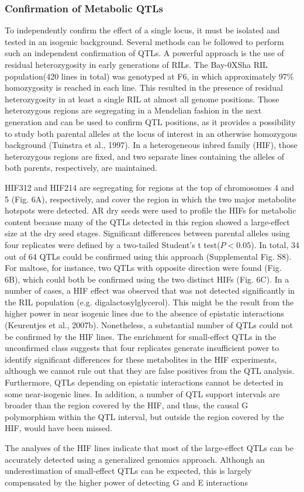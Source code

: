 \subsubsection{Confirmation of Metabolic QTLs}
To independently confirm the effect of a single locus, it must be isolated and tested in an isogenic 
background. Several methods can be followed to perform such an independent confirmation of QTLs. A 
powerful approach is the use of residual heterozygosity in early generations of RILs. The Bay-0XSha 
RIL population(420 lines in total) was genotyped at F6, in which approximately 97\% homozygosity is 
reached in each line. This resulted in the presence of residual heterozygosity in at least a single 
RIL at almost all genome positions. Those heterozygous regions are segregating in a Mendelian fashion 
in the next generation and can be used to confirm QTL positions, as it provides a possibility to
study both parental alleles at the locus of interest in an otherwise homozygous background 
(Tuinstra et al., 1997). In a heterogeneous inbred family (HIF), those heterozygous regions are fixed, 
and two separate lines containing the alleles of both parents, respectively, are maintained.

HIF312 and HIF214 are segregating for regions at the top of chromosomes 4 and 5 (Fig. 6A), respectively,
and cover the region in which the two major metabolite hotspots were detected. AR dry seeds were used to
profile the HIFs for metabolic content because many of the QTLs detected in this region showed a 
large-effect size at the dry seed stages. Significant differences between parental alleles using four 
replicates were defined by a two-tailed Student's t test($P < 0.05$). In total, 34 out of 64 QTLs could 
be confirmed using this approach (Supplemental Fig. S8). For maltose, for instance, two QTLs with 
opposite direction were found (Fig. 6B), which could both be confirmed using the two distinct HIFs 
(Fig. 6C). In a number of cases, a HIF effect was observed that was not detected significantly
in the RIL population (e.g. digalactosylglycerol). This might be the result from the higher power in 
near isogenic lines due to the absence of epistatic interactions (Keurentjes et al., 2007b). Nonetheless, 
a substantial number of QTLs could not be confirmed by the HIF lines. The enrichment for small-effect 
QTLs in the unconfirmed class suggests that four replicates generate insufficient power to identify 
significant differences for these metabolites in the HIF experiments, although we cannot rule out that 
they are false positives from the QTL analysis. Furthermore, QTLs depending on epistatic interactions 
cannot be detected in some near-isogenic lines. In addition, a number of QTL support intervals are 
broader than the region covered by the HIF, and thus, the causal G polymorphism within the QTL interval, 
but outside the region covered by the HIF, would have been missed.

The analyses of the HIF lines indicate that most of the large-effect QTLs can be accurately detected 
using a generalized genomics approach. Although an underestimation of small-effect QTLs can be expected, 
this is largely compensated by the higher power of detecting G and E interactions


